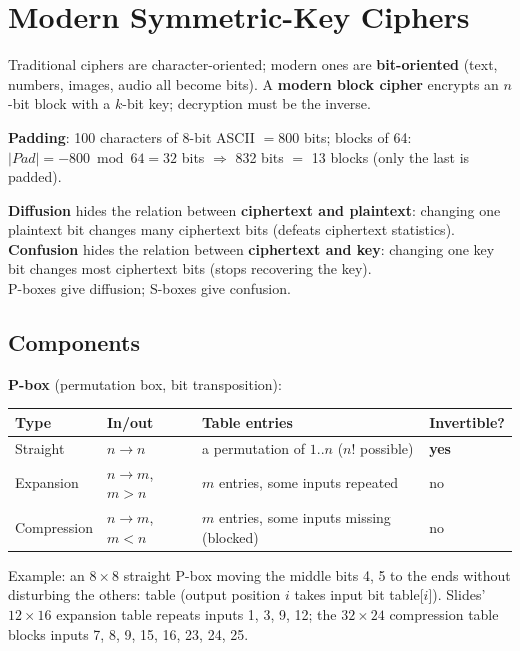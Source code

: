 \section{Modern Symmetric-Key Ciphers}

Traditional ciphers are character-oriented; modern ones are \textbf{bit-oriented} (text, numbers, images, audio all become bits). A \textbf{modern block cipher} encrypts an $n$-bit block with a $k$-bit key; decryption must be the inverse.

\textbf{Padding}: 100 characters of 8-bit ASCII $= 800$ bits; blocks of 64: $|Pad| = -800 \bmod 64 = 32$ bits $\Rightarrow$ 832 bits $=$ 13 blocks (only the last is padded).

\begin{keybox}[title=Diffusion vs.\ confusion (Shannon)]
\textbf{Diffusion} hides the relation between \textbf{ciphertext and plaintext}: changing one plaintext bit changes many ciphertext bits (defeats ciphertext statistics).\\
\textbf{Confusion} hides the relation between \textbf{ciphertext and key}: changing one key bit changes most ciphertext bits (stops recovering the key).\\
P-boxes give diffusion; S-boxes give confusion.
\end{keybox}

\subsection{Components}
\textbf{P-box} (permutation box, bit transposition):
\begin{center}\small
\begin{tabular}{@{}llll@{}}
\toprule
Type & In/out & Table entries & Invertible?\\
\midrule
Straight & $n \to n$ & a permutation of $1..n$ ($n!$ possible) & \textbf{yes}\\
Expansion & $n \to m$, $m > n$ & $m$ entries, some inputs repeated & no\\
Compression & $n \to m$, $m < n$ & $m$ entries, some inputs missing (blocked) & no\\
\bottomrule
\end{tabular}
\end{center}
Example: an $8 \times 8$ straight P-box moving the middle bits 4, 5 to the ends without disturbing the others: table \ttx{[4 1 2 3 6 7 8 5]} (output position $i$ takes input bit table[$i$]). Slides' $12 \times 16$ expansion table repeats inputs 1, 3, 9, 12; the $32 \times 24$ compression table blocks inputs 7, 8, 9, 15, 16, 23, 24, 25.

